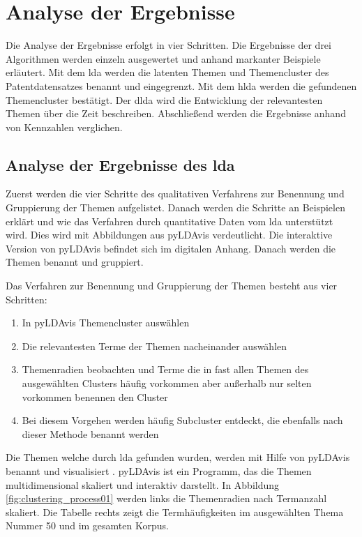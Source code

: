 \chapter{Analyse der Ergebnisse}


Die Analyse der Ergebnisse erfolgt in vier Schritten. Die Ergebnisse der drei Algorithmen werden einzeln ausgewertet und anhand markanter Beispiele erläutert. Mit dem \gls{lda} werden die latenten Themen und Themencluster des Patentdatensatzes benannt und eingegrenzt. Mit dem \gls{hlda} werden die gefundenen Themencluster bestätigt. Der \gls{dlda} wird die Entwicklung der relevantesten Themen über die Zeit beschreiben. Abschließend werden die Ergebnisse anhand von Kennzahlen verglichen.


\section{Analyse der Ergebnisse des \gls{lda}} \label{lda_analysis}

Zuerst werden die vier Schritte des qualitativen Verfahrens zur Benennung und Gruppierung der Themen aufgelistet. Danach werden die Schritte an Beispielen erklärt und wie das Verfahren durch quantitative Daten vom \gls{lda} unterstützt wird. Dies wird mit Abbildungen aus \gls{pyLDAvis} verdeutlicht. Die interaktive Version von \gls{pyLDAvis} befindet sich im digitalen Anhang. Danach werden die Themen benannt und gruppiert.

Das Verfahren zur Benennung und Gruppierung der Themen besteht aus vier Schritten:
\begin{enumerate}
	\item In \gls{pyLDAvis} Themencluster auswählen
	\item Die relevantesten Terme der Themen nacheinander auswählen
	\item Themenradien beobachten und Terme die in fast allen Themen des ausgewählten Clusters häufig vorkommen aber außerhalb nur selten vorkommen benennen den Cluster
	\item Bei diesem Vorgehen werden häufig Subcluster entdeckt, die ebenfalls nach dieser Methode benannt werden
\end{enumerate}

Die Themen welche durch \gls{lda} gefunden wurden, werden mit Hilfe von \gls{pyLDAvis} benannt und visualisiert \parencite[vgl.][S. 63]{sievert2014ldavis}. \gls{pyLDAvis} ist ein Programm, das die Themen multidimensional skaliert und interaktiv darstellt. In Abbildung \ref{fig:clustering_process01} werden links die Themenradien nach Termanzahl skaliert. Die Tabelle rechts zeigt die Termhäufigkeiten im ausgewählten Thema Nummer 50 und im gesamten Korpus.

